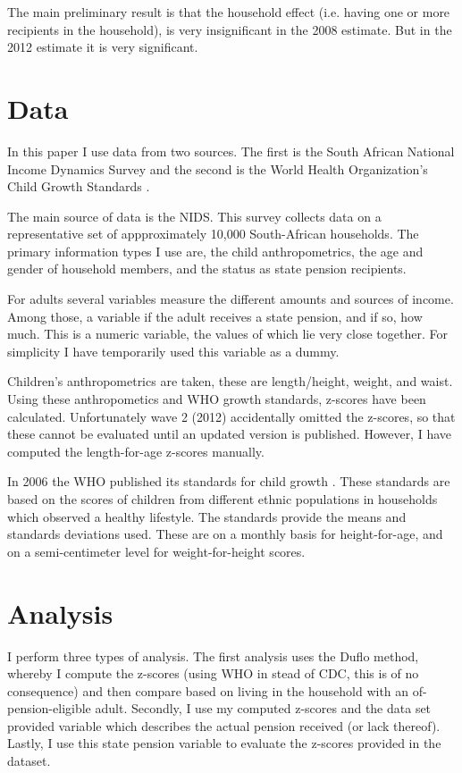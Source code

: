 \documentclass[a4paper]{report}
\begin{document}
\begin{refsection}
The main preliminary result is that the household effect (i.e. having one or more recipients in the household),
is very insignificant in the 2008 estimate.
But in the 2012 estimate it is very significant.

\section{Data}
\label{sa:data}
In this paper I use data from two sources.
The first is the South African National Income Dynamics Survey \parencite[NIDS]{saldru2008nids, saldru2012nids, saldru2013nids} and the second is the World Health Organization's Child Growth Standards \parencite[WHO]{who2006child}.

The main source of data is the NIDS.
This survey collects data on a representative set of appproximately 10,000 South-African households.
The primary information types I use are, the child anthropometrics, the age and gender of household members, and the status as state pension recipients.

For adults several variables measure the different amounts and sources of income.
Among those, a variable if the adult receives a state pension, and if so, how much.
This is a numeric variable, the values of which lie very close together.
For simplicity I have temporarily used this variable as a dummy.

Children's anthropometrics are taken, these are length/height, weight, and waist.
Using these anthropometics and WHO growth standards, z-scores have been calculated.
Unfortunately wave 2 (2012) accidentally omitted the z-scores, so that these cannot be evaluated until an updated version is published.
However, I have computed the length-for-age z-scores manually.

In 2006 the WHO published its standards for child growth \parencite{who2006child}.
These standards are based on the scores of children from different ethnic populations in households which observed a healthy lifestyle.
The standards provide the means and standards deviations used. 
These are on a monthly basis for height-for-age, and on a semi-centimeter level for weight-for-height scores.

\section{Analysis}
\label{sa:analysis}
I perform three types of analysis.
The first analysis uses the Duflo method, whereby I compute the z-scores (using WHO in stead of CDC, this is of no consequence)
and then compare based on living in the household with an of-pension-eligible adult.
Secondly, I use my computed z-scores and the data set provided variable which describes the actual pension received (or lack thereof).
Lastly, I use this state pension variable to evaluate the z-scores provided in the dataset.


\end{refsection}
\end{document}
